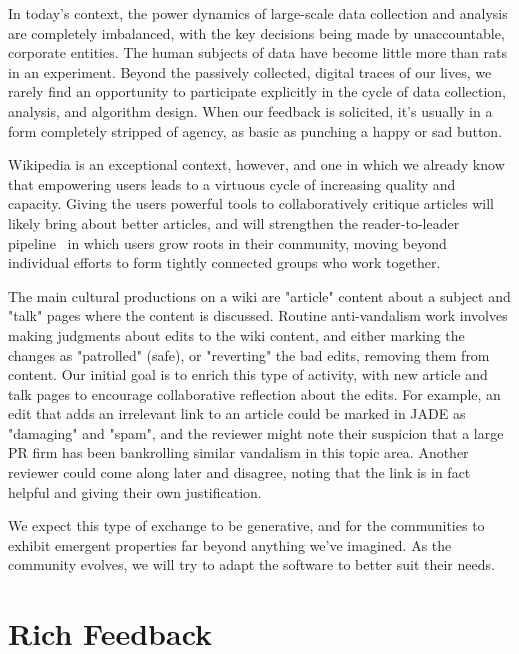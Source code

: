 \documentclass{sigchi-ext}
\begin{document}
In today's context, the power dynamics of large-scale data collection and analysis are completely imbalanced, with the key decisions being made by unaccountable, corporate entities.  The human subjects of data have become little more than rats in an experiment.  Beyond the passively collected, digital traces of our lives, we rarely find an opportunity to participate explicitly in the cycle of data collection, analysis, and algorithm design.  When our feedback is solicited, it's usually in a form completely stripped of agency, as basic as punching a happy or sad button.\cite{levaniemi2012indicator}

Wikipedia is an exceptional context, however, and one in which we already know that empowering users leads to a virtuous cycle of increasing quality and capacity.  Giving the users powerful tools to collaboratively critique articles will likely bring about better articles, and will strengthen the reader-to-leader pipeline~\cite{preece2009reader} in which users grow roots in their community, moving beyond individual efforts to form tightly connected groups who work together.

The main cultural productions on a wiki are "article" content about a subject and "talk" pages where the content is discussed.  Routine anti-vandalism work involves making judgments about edits to the wiki content, and either marking the changes as "patrolled" (safe), or "reverting" the bad edits, removing them from content.  Our initial goal is to enrich this type of activity, with new article and talk pages to encourage collaborative reflection about the edits.  For example, an edit that adds an irrelevant link to an article could be marked in JADE as "damaging" and "spam", and the reviewer might note their suspicion that a large PR firm has been bankrolling similar vandalism in this topic area.  Another reviewer could come along later and disagree, noting that the link is in fact helpful and giving their own justification.

We expect this type of exchange to be generative, and for the communities to exhibit emergent properties far beyond anything we've imagined.  As the community evolves, we will try to adapt the software to better suit their needs.

\section{Rich Feedback}
\end{document}
